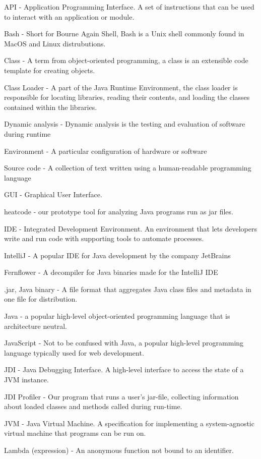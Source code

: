 API - Application Programming Interface. A set of instructions that can be used to interact with an application or module.

Bash - Short for Bourne Again Shell, Bash is a Unix shell commonly found in MacOS and Linux distrubutions.

Class - A term from object-oriented programming, a class is an extensible code template for creating objects.

Class Loader - A part of the Java Runtime Environment, the class loader is responsible for locating libraries, reading their contents, and loading the classes contained within the libraries.

Dynamic analysis - Dynamic analysis is the testing and evaluation of software during runtime

Environment - A particular configuration of hardware or software

Source code -  A collection of text written using a human-readable programming language

GUI - Graphical User Interface.

heatcode - our prototype tool for analyzing Java programs run as jar files.

IDE - Integrated Development Environment. An environment that lets developers write and run code with supporting tools to automate processes.

IntelliJ - A popular IDE for Java development by the company JetBrains

Fernflower - A decompiler for Java binaries made for the IntelliJ IDE

.jar, Java binary - A file format that aggregates Java class files and metadata in one file for distribution.

Java - a popular high-level object-oriented programming language that is architecture neutral.

JavaScript - Not to be confused with Java, a popular high-level programming language typically used for web development.

JDI - Java Debugging Interface. A high-level interface to access the state of a JVM instance. 

JDI Profiler - Our program that runs a user's jar-file, collecting information about loaded classes and methods called during run-time.

JVM - Java Virtual Machine. A specification for implementing a system-agnostic virtual machine that programs can be run on.

Lambda (expression) - An anonymous function not bound to an identifier.

